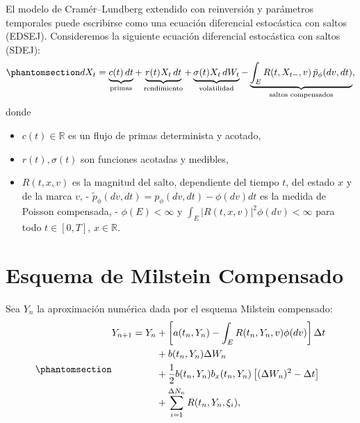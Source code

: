 \documentclass[
  spanish,
  us-letterpaper,
]{scrreprt}
\theoremstyle{plain}
\theoremstyle{plain}
\theoremstyle{definition}
\theoremstyle{remark}
\begin{document}
El modelo de Cramér--Lundberg extendido con reinversión y parámetros
temporales puede escribirse como una ecuación diferencial estocástica
con saltos (EDSEJ). Consideremos la siguiente ecuación diferencial
estocástica con saltos (SDEJ):
\begin{equation}\protect\phantomsection\label{eq-sdej}{d X_t = \underbrace{c(t)\,dt}_{\text{primas}} + \underbrace{r(t) X_t\,dt}_{\text{rendimiento}} + \underbrace{\sigma(t) X_t\,d W_t}_{\text{volatilidad}} - \underbrace{\int_E R(t, X_{t-}, v)\,\tilde{p}_\phi(dv, dt)}_{\text{saltos compensados}},}\end{equation}
donde

\begin{itemize}
\item
  \(c(t) \in \mathbb{R}\) es un flujo de primas determinista y acotado,
\item
  \(r(t), \sigma(t)\) son funciones acotadas y medibles,
\item
  \(R(t, x, v)\) es la magnitud del salto, dependiente del tiempo \(t\),
  del estado \(x\) y de la marca \(v\), -
  \(\tilde{p}_\phi(dv, d t) = p_\phi(d v, dt) - \phi(dv)d t\) es la
  medida de Poisson compensada, - \(\phi(E) < \infty\) y
  \(\int_E |R(t, x, v)|^2 \phi(d v) < \infty\) para todo
  \(t \in [0,T]\), \(x \in \mathbb{R}\).
\end{itemize}

\section{Esquema de Milstein
Compensado}\label{esquema-de-milstein-compensado}

Sea \(Y_n\) la aproximación numérica dada por el esquema Milstein
compensado:
\begin{equation}\protect\phantomsection\label{eq-milstein_ec}{\begin{aligned}
Y_{n+1} = Y_n &+ \left[ a(t_n, Y_n) - \int_E R(t_n, Y_n, v) \phi(d v) \right]\Delta t \\
&+ b(t_n, Y_n) \Delta W_n \\
&+ \frac{1}{2} b(t_n, Y_n) b_x(t_n, Y_n) \left[ (\Delta W_n)^2 - \Delta t \right] \\
&+ \sum_{i=1}^{\Delta N_n} R(t_n, Y_n, \xi_i),
\end{aligned}}\end{equation}
\end{document}
